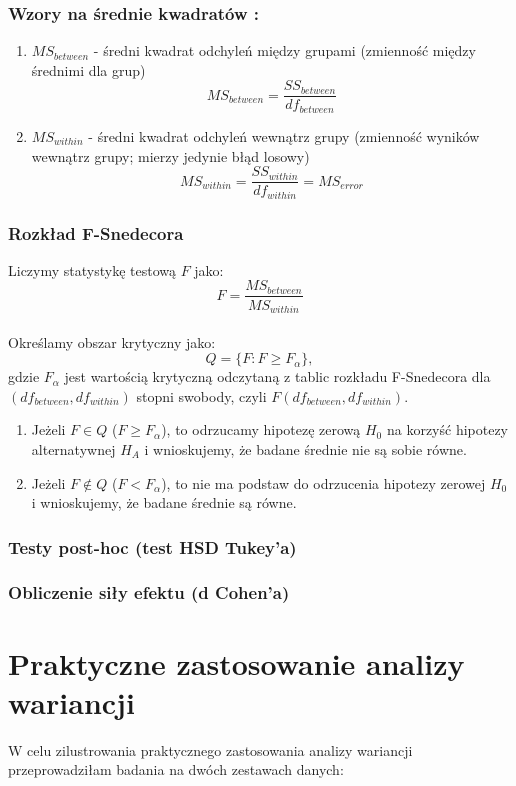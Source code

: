 \documentclass[12pt,a4paper]{article}
\begin{document}
\subsubsection{Wzory na średnie kwadratów \cite{witte2010statistics}:}
\begin{enumerate}
    \item $MS_{between}$ - średni kwadrat odchyleń między grupami (zmienność między średnimi dla grup)
    $$MS_{between}=\frac{SS_{between}}{df_{between}}$$
    \item $MS_{within}$ - średni kwadrat odchyleń wewnątrz grupy (zmienność wyników wewnątrz grupy; mierzy jedynie błąd losowy)
    $$MS_{within}=\frac{SS_{within}}{df_{within}}=MS_{error}$$
\end{enumerate}

\newpage
\subsubsection{Rozkład F-Snedecora}
Liczymy statystykę testową $F$ jako:
$$F=\frac{MS_{between}}{MS_{within}}$$
\\
Określamy obszar krytyczny jako:
$$Q=\{F:F\geq F_{\alpha}\},$$
gdzie $F_{\alpha}$ jest wartością krytyczną odczytaną z tablic rozkładu F-Snedecora dla $(df_{between},df_{within})$ stopni swobody, czyli  $F(df_{between},df_{within})$.
\\
\begin{enumerate}
    \item Jeżeli $F\in Q$ ($F\geq F_{\alpha}$), to odrzucamy hipotezę zerową $H_0$ na korzyść hipotezy alternatywnej $H_A$ i wnioskujemy, że badane średnie nie są sobie równe.
    \item Jeżeli $F\not\in Q$ ($F< F_{\alpha}$), to nie ma podstaw do odrzucenia hipotezy zerowej $H_0$ i wnioskujemy, że badane średnie są równe.
\end{enumerate}


\newpage
\subsubsection{Testy post-hoc (test HSD Tukey'a)}

\subsubsection{Obliczenie siły efektu (d Cohen'a)}

\newpage
\section{Praktyczne zastosowanie analizy wariancji}
W celu zilustrowania praktycznego zastosowania analizy wariancji przeprowadziłam badania na dwóch zestawach danych:
\end{document}
